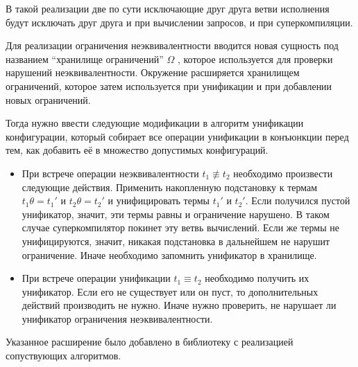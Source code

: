 В такой реализации две по сути исключающие друг друга ветви исполнения будут исключать друг друга
и при вычислении запросов, и при суперкомпиляции.

Для реализации ограничения неэквивалентности вводится новая сущность под названием
``хранилище ограничений'' $\Omega$ , которое используется для проверки
нарушений неэквивалентности. Окружение расширяется хранилищем ограничений, которое затем используется
при унификации и при добавлении новых ограничений.

Тогда нужно ввести следующие модификации в алгоритм унификации конфигурации, который собирает все
операции унификации в конъюнкции перед тем, как добавить её в множество допустимых конфигураций.
\begin{itemize}
\item При встрече операции неэквивалентности $t_1 \not\equiv t_2$ необходимо произвести следующие действия.
      Применить накопленную подстановку к термам $t_1 \theta = t_1'$ и $t_2 \theta = t_2'$ и
      унифицировать термы $t_1'$ и $t_2'$. Если получился пустой унификатор, значит, эти термы
      равны и ограничение нарушено. В таком случае суперкомпилятор покинет эту
      ветвь вычислений. Если же термы не унифицируются, значит, никакая подстановка
      в дальнейшем не нарушит ограничение. Иначе необходимо запомнить унификатор в хранилище.
\item При встрече операции унификации $t_1 \equiv t_2$ необходимо получить их унификатор.
      Если его не существует или он пуст, то дополнительных действий производить не нужно.
	  Иначе нужно проверить, не нарушает ли унификатор ограничения неэквивалентности.
\end{itemize}

Указанное расширение было добавлено в библиотеку с реализацией сопуствующих алгоритмов.


